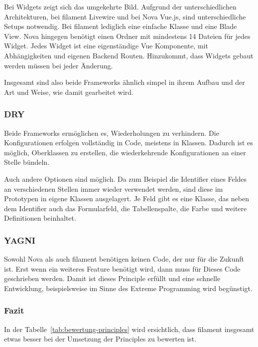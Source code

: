 Bei Widgets zeigt sich das umgekehrte Bild.
Aufgrund der unterschiedlichen Architekturen, bei filament Livewire und bei Nova Vue.js, sind unterschiedliche Setups notwendig.
Bei filament lediglich eine einfache Klasse und eine Blade View.
Nova hingegen benötigt einen Ordner mit mindestens 14 Dateien für jedes Widget.
Jedes Widget ist eine eigenständige Vue Komponente, mit Abhängigkeiten und eigenen Backend Routen.
Hinzukommt, dass Widgets gebaut werden müssen bei jeder Änderung.

Insgesamt sind also beide Frameworks ähnlich simpel in ihrem Aufbau und der Art und Weise, wie damit gearbeitet wird.

\subsubsection{DRY}
Beide Frameworks ermöglichen es, Wiederholungen zu verhindern.
Die Konfigurationen erfolgen vollständig in Code, meistens in Klassen.
Dadurch ist es möglich, Oberklassen zu erstellen, die wiederkehrende Konfigurationen an einer Stelle bündeln.

Auch andere Optionen sind möglich.
Da zum Beispiel die Identifier eines Feldes an verschiedenen Stellen immer wieder verwendet werden, sind diese im Prototypen in eigene Klassen ausgelagert.
Je Feld gibt es eine Klasse, das neben dem Identifier auch das Formularfeld, die Tabellenspalte, die Farbe und weitere Definitionen beinhaltet.

\subsubsection{YAGNI}
Sowohl Nova als auch filament benötigen keinen Code, der nur für die Zukunft ist.
Erst wenn ein weiteres Feature benötigt wird, dann muss für Dieses Code geschrieben werden.
Damit ist dieses Principle erfüllt und eine schnelle Entwicklung, beispielsweise im Sinne des Extreme Programming wird begünstigt.

\newpage

\subsubsection{Fazit}
In der Tabelle~\ref{tab:bewertung-principles} wird ersichtlich, dass filament insgesamt etwas besser bei der Umsetzung der Principles zu bewerten ist.

